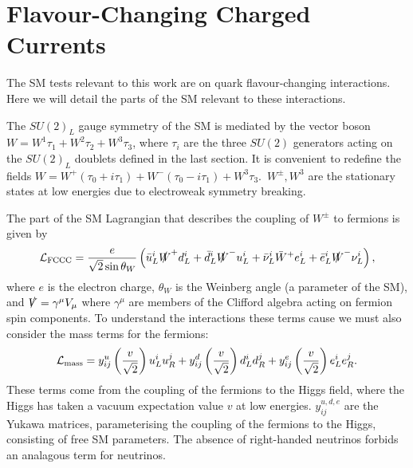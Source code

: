 \section{Flavour-Changing Charged Currents}
\label{sec:fccc}

The SM tests relevant to this work are on quark flavour-changing interactions. Here we will detail the parts of the SM relevant to these interactions.

The $SU(2)_L$ gauge symmetry of the SM is mediated by the vector boson $W=W^1\tau_1 + W^2\tau_2 + W^3\tau_3$, where $\tau_i$ are the three $SU(2)$ generators acting on the $SU(2)_L$ doublets defined in the last section. It is convenient to redefine the fields $W = W^+ ( \tau_0 + i\tau_1 ) + W^- ( \tau_0 - i\tau_1 ) + W^3 \tau_3$.\, $W^{\pm},W^3$ are the stationary states at low energies due to electroweak symmetry breaking.

The part of the SM Lagrangian that describes the coupling of $W^{\pm}$ to fermions is given by
\begin{align}
  \mathcal{L}_{\text{FCCC}} = {e\over \sqrt{2}\sin\theta_W} \left( \bar{u}_L^i \slashed{W}^+ d_L^i + \bar{d}_L^i \slashed{W}^- u_L^i + \bar{\nu}_L^i \bar{W}^+ e_L^i + \bar{e}_L^i \slashed{W}^- \nu_L^i \right),
  \label{eq:FCCC}
\end{align}
where $e$ is the electron charge, $\theta_W$ is the Weinberg angle (a parameter of the SM), and $\slashed{V} = \gamma^{\mu} V_{\mu}$ where $\gamma^{\mu}$ are members of the Clifford algebra acting on fermion spin components. To understand the interactions these terms cause we must also consider the mass terms for the fermions:
\begin{align}
  \mathcal{L}_{\text{mass}} = y_{ij}^u \left({v\over \sqrt{2}}\right) u_L^i u_R^j + y_{ij}^d \left({v\over \sqrt{2}}\right) d_L^i d_R^j + y_{ij}^e \left({v\over \sqrt{2}}\right) e_L^i e_R^j.
\end{align}
These terms come from the coupling of the fermions to the Higgs field, where the Higgs has taken a vacuum expectation value $v$ at low energies. $y^{u,d,e}_{ij}$ are the Yukawa matrices, parameterising the coupling of the fermions to the Higgs, consisting of free SM parameters. The absence of right-handed neutrinos forbids an analagous term for neutrinos.

